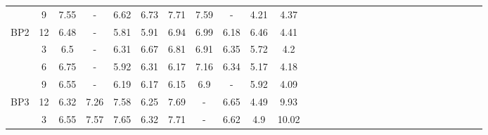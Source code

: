 \begin{table}[h]
{\begin{tabular}{l|l|l|l|l|l|l|l|l|l|lllllllllllllllllll}
\multicolumn{1}{c|}{} & \multicolumn{1}{c|}{9} & \multicolumn{1}{c|}{7.55} & \multicolumn{1}{c|}{-} & \multicolumn{1}{c|}{6.62} & \multicolumn{1}{c|}{6.73} & \multicolumn{1}{c|}{7.71} & \multicolumn{1}{c|}{7.59} & \multicolumn{1}{c|}{-} & \multicolumn{1}{c|}{4.21} & \multicolumn{1}{c}{4.37} &  &  &  &  &  &  &  &  &  &  &  &  &  &  &  &  &  &  \\ 
\cline{1-11}
\multicolumn{1}{c|}{BP2} & \multicolumn{1}{c|}{12} & \multicolumn{1}{c|}{6.48} & \multicolumn{1}{c|}{-} & \multicolumn{1}{c|}{5.81} & \multicolumn{1}{c|}{5.91} & \multicolumn{1}{c|}{6.94} & \multicolumn{1}{c|}{6.99} & \multicolumn{1}{c|}{6.18} & \multicolumn{1}{c|}{6.46} & \multicolumn{1}{c}{4.41} &  &  &  &  &  &  &  &  &  &  &  &  &  &  &  &  &  &  \\ 
\multicolumn{1}{c|}{} & \multicolumn{1}{c|}{3} & \multicolumn{1}{c|}{6.5} & \multicolumn{1}{c|}{-} & \multicolumn{1}{c|}{6.31} & \multicolumn{1}{c|}{6.67} & \multicolumn{1}{c|}{6.81} & \multicolumn{1}{c|}{6.91} & \multicolumn{1}{c|}{6.35} & \multicolumn{1}{c|}{5.72} & \multicolumn{1}{c}{4.2} &  &  &  &  &  &  &  &  &  &  &  &  &  &  &  &  &  &  \\ 
\multicolumn{1}{c|}{} & \multicolumn{1}{c|}{6} & \multicolumn{1}{c|}{6.75} & \multicolumn{1}{c|}{-} & \multicolumn{1}{c|}{5.92} & \multicolumn{1}{c|}{6.31} & \multicolumn{1}{c|}{6.17} & \multicolumn{1}{c|}{7.16} & \multicolumn{1}{c|}{6.34} & \multicolumn{1}{c|}{5.17} & \multicolumn{1}{c}{4.18} &  &  &  &  &  &  &  &  &  &  &  &  &  &  &  &  &  &  \\ 
\multicolumn{1}{c|}{} & \multicolumn{1}{c|}{9} & \multicolumn{1}{c|}{6.55} & \multicolumn{1}{c|}{-} & \multicolumn{1}{c|}{6.19} & \multicolumn{1}{c|}{6.17} & \multicolumn{1}{c|}{6.15} & \multicolumn{1}{c|}{6.9} & \multicolumn{1}{c|}{-} & \multicolumn{1}{c|}{5.92} & \multicolumn{1}{c}{4.09} &  &  &  &  &  &  &  &  &  &  &  &  &  &  &  &  &  &  \\ 
\cline{1-11}
\multicolumn{1}{c|}{BP3} & \multicolumn{1}{c|}{12} & \multicolumn{1}{c|}{6.32} & \multicolumn{1}{c|}{7.26} & \multicolumn{1}{c|}{7.58} & \multicolumn{1}{c|}{6.25} & \multicolumn{1}{c|}{7.69} & \multicolumn{1}{c|}{-} & \multicolumn{1}{c|}{6.65} & \multicolumn{1}{c|}{4.49} & \multicolumn{1}{c}{9.93} &  &  &  &  &  &  &  &  &  &  &  &  &  &  &  &  &  &  \\ 
 & \multicolumn{1}{c|}{3} & \multicolumn{1}{c|}{6.55} & \multicolumn{1}{c|}{7.57} & \multicolumn{1}{c|}{7.65} & \multicolumn{1}{c|}{6.32} & \multicolumn{1}{c|}{7.71} & \multicolumn{1}{c|}{-} & \multicolumn{1}{c|}{6.62} & \multicolumn{1}{c|}{4.9} & \multicolumn{1}{c}{10.02} &  &  &  &  &  &  &  &  &  &  &  &  &  &  &  &  &  &  \\ 

\end{tabular}}
\end{table}
